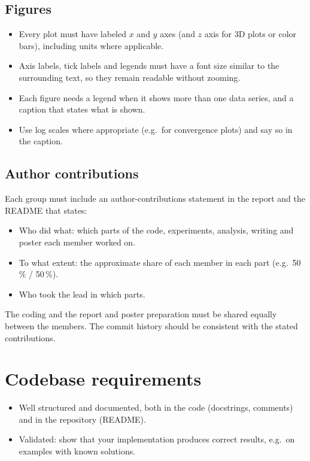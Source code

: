 \documentclass[11pt,a4paper]{article}
\begin{document}
\subsection*{Figures}
\begin{itemize}
  \item Every plot must have labeled $x$ and $y$ axes (and $z$ axis for 3D
        plots or color bars), including units where applicable.
  \item Axis labels, tick labels and legends must have a font size similar to
        the surrounding text, so they remain readable without zooming.
  \item Each figure needs a legend when it shows more than one data series,
        and a caption that states what is shown.
  \item Use log scales where appropriate (e.g.\ for convergence plots) and say
        so in the caption.
\end{itemize}

\subsection*{Author contributions}
Each group must include an author-contributions statement in the report and
the README that states:
\begin{itemize}
  \item Who did what: which parts of the code, experiments, analysis, writing
        and poster each member worked on.
  \item To what extent: the approximate share of each member in each part
        (e.g.\ 50\,\% / 50\,\%).
  \item Who took the lead in which parts.
\end{itemize}
The coding and the report and poster preparation must be shared equally
between the members. The commit history should be consistent with the stated
contributions.

\section*{Codebase requirements}
\begin{itemize}
  \item Well structured and documented, both in the code (docstrings,
        comments) and in the repository (README).
  \item Validated: show that your implementation produces correct results,
        e.g.\ on examples with known solutions.\end{itemize}
\end{document}
